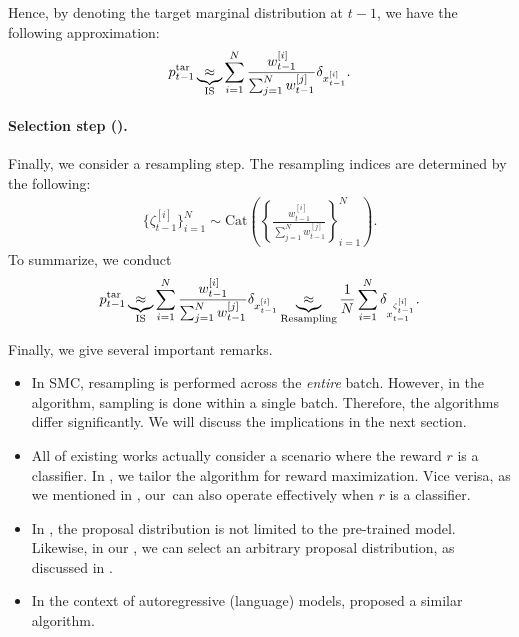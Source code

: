 Hence, by denoting the target marginal distribution at $t-1$, we have the following approximation: 
\begin{align*}
     p^{\mathrm{tar}}_{t-1}  \underbrace{\approx}_{\text{IS}} \sum_{i=1}^N  \frac{w^{[i]}_{t-1}}{\sum_{j=1}^N w^{[j]}_{t-1} } \delta_{x^{[i]}_{t-1} }. 
\end{align*}

\paragraph{Selection step ().}
Finally, we consider a resampling step. The resampling indices are determined by the following: 
\begin{align*}
    \{\zeta^{[i]}_{t-1}\}_{i=1}^N \sim \mathrm{Cat}\left ( \left \{\frac{w^{[i]}_{t-1}}{\sum_{j=1}^N w^{[j]}_{t-1} } \right \}_{i=1}^N \right). 
\end{align*}
To summarize, we conduct 
\begin{align*}
      p^{\mathrm{tar}}_{t-1}  \underbrace{\approx}_{\text{IS}} \sum_{i=1}^N  \frac{w^{[i]}_{t-1}}{\sum_{j=1}^N w^{[j]}_{t-1} } \delta_{x^{[i]}_{t-1}} \underbrace{\approx}_{\text{Resampling}} \frac{1}{N} \sum_{i=1}^N \delta_{x^{\zeta_{t-1}^{[i]}}_{t-1} }. 
\end{align*}


{Finally, we give several important remarks. 
\begin{itemize}
\item In SMC, resampling is performed across the \emph{entire} batch. However, in the algorithm, sampling is done within a single batch. Therefore, the algorithms differ significantly. We will discuss the implications in the next section.
\item All of existing works \citet{wu2024practical,cardoso2023monte,phillips2024particle,dou2024diffusion} actually consider a scenario where the reward $r$ is a classifier. In , we tailor the algorithm for reward maximization. Vice verisa, as we mentioned in , our \alg\,can also operate effectively when $r$ is a classifier.
\item In \citet{wu2024practical,cardoso2023monte,phillips2024particle}, the proposal distribution is not limited to the pre-trained model. Likewise, in our \alg, we can select an arbitrary proposal distribution, as discussed in . 
    \item In the context of autoregressive (language) models, \citet{zhao2024probabilistic,lew2023sequential} proposed a similar algorithm.  
\end{itemize}
} 

